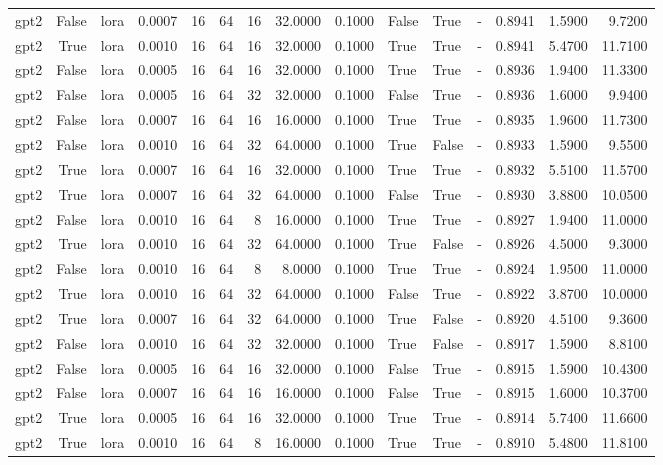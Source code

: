 \begin{tabular}{lrlrrrrrrlllrrr}
gpt2 & False & lora & 0.0007 & 16 & 64 & 16 & 32.0000 & 0.1000 & False & True & - & 0.8941 & 1.5900 & 9.7200 \\
gpt2 & True & lora & 0.0010 & 16 & 64 & 16 & 32.0000 & 0.1000 & True & True & - & 0.8941 & 5.4700 & 11.7100 \\
gpt2 & False & lora & 0.0005 & 16 & 64 & 16 & 32.0000 & 0.1000 & True & True & - & 0.8936 & 1.9400 & 11.3300 \\
gpt2 & False & lora & 0.0005 & 16 & 64 & 32 & 32.0000 & 0.1000 & False & True & - & 0.8936 & 1.6000 & 9.9400 \\
gpt2 & False & lora & 0.0007 & 16 & 64 & 16 & 16.0000 & 0.1000 & True & True & - & 0.8935 & 1.9600 & 11.7300 \\
gpt2 & False & lora & 0.0010 & 16 & 64 & 32 & 64.0000 & 0.1000 & True & False & - & 0.8933 & 1.5900 & 9.5500 \\
gpt2 & True & lora & 0.0007 & 16 & 64 & 16 & 32.0000 & 0.1000 & True & True & - & 0.8932 & 5.5100 & 11.5700 \\
gpt2 & True & lora & 0.0007 & 16 & 64 & 32 & 64.0000 & 0.1000 & False & True & - & 0.8930 & 3.8800 & 10.0500 \\
gpt2 & False & lora & 0.0010 & 16 & 64 & 8 & 16.0000 & 0.1000 & True & True & - & 0.8927 & 1.9400 & 11.0000 \\
gpt2 & True & lora & 0.0010 & 16 & 64 & 32 & 64.0000 & 0.1000 & True & False & - & 0.8926 & 4.5000 & 9.3000 \\
gpt2 & False & lora & 0.0010 & 16 & 64 & 8 & 8.0000 & 0.1000 & True & True & - & 0.8924 & 1.9500 & 11.0000 \\
gpt2 & True & lora & 0.0010 & 16 & 64 & 32 & 64.0000 & 0.1000 & False & True & - & 0.8922 & 3.8700 & 10.0000 \\
gpt2 & True & lora & 0.0007 & 16 & 64 & 32 & 64.0000 & 0.1000 & True & False & - & 0.8920 & 4.5100 & 9.3600 \\
gpt2 & False & lora & 0.0010 & 16 & 64 & 32 & 32.0000 & 0.1000 & True & False & - & 0.8917 & 1.5900 & 8.8100 \\
gpt2 & False & lora & 0.0005 & 16 & 64 & 16 & 32.0000 & 0.1000 & False & True & - & 0.8915 & 1.5900 & 10.4300 \\
gpt2 & False & lora & 0.0007 & 16 & 64 & 16 & 16.0000 & 0.1000 & False & True & - & 0.8915 & 1.6000 & 10.3700 \\
gpt2 & True & lora & 0.0005 & 16 & 64 & 16 & 32.0000 & 0.1000 & True & True & - & 0.8914 & 5.7400 & 11.6600 \\
gpt2 & True & lora & 0.0010 & 16 & 64 & 8 & 16.0000 & 0.1000 & True & True & - & 0.8910 & 5.4800 & 11.8100 \\

\end{tabular}
